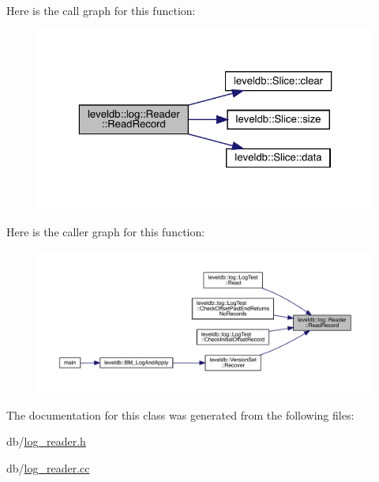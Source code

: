 Here is the call graph for this function\+:
\nopagebreak
\begin{figure}[H]
\begin{center}
\leavevmode
\includegraphics[width=323pt]{classleveldb_1_1log_1_1_reader_a84059598c9367cb677a9d70d77993282_cgraph}
\end{center}
\end{figure}
Here is the caller graph for this function\+:
\nopagebreak
\begin{figure}[H]
\begin{center}
\leavevmode
\includegraphics[width=350pt]{classleveldb_1_1log_1_1_reader_a84059598c9367cb677a9d70d77993282_icgraph}
\end{center}
\end{figure}


The documentation for this class was generated from the following files\+:\begin{DoxyCompactItemize}
\item 
db/\mbox{\hyperlink{log__reader_8h}{log\+\_\+reader.\+h}}\item 
db/\mbox{\hyperlink{log__reader_8cc}{log\+\_\+reader.\+cc}}\end{DoxyCompactItemize}
